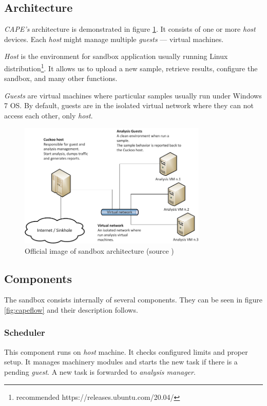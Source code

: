 \subsection{Architecture}
\emph{CAPE's} architecture is demonstrated in figure \ref{fig:capearchitecture}. It consists of one or more \emph{host} devices. Each \emph{host} might manage multiple \emph{guests} --- virtual machines. 

\emph{Host} is the environment for sandbox application usually running Linux distribution\footnote{recommended https://releases.ubuntu.com/20.04/}. It allows us to upload a new sample, retrieve results, configure the sandbox, and many other functions.

\emph{Guests} are virtual machines where particular samples usually run under Windows 7 OS. By default, guests are in the isolated virtual network where they can not access each other, only \emph{host}.

\begin{figure}[h]
  \centering
  \includegraphics[width=0.8\textwidth]{figures/architecture.png}
  \caption{Official image of sandbox architecture (source \cite{CAPESand75:online})}
  \label{fig:capearchitecture}
\end{figure}


\subsection{Components}
The sandbox consists internally of several components. They can be seen in figure \ref{fig:capeflow} and their description follows.

\subsubsection*{Scheduler}
This component runs on \emph{host} machine. It checks configured limits and proper setup. It manages machinery modules and starts the new task if there is a pending \emph{guest}. A new task is forwarded to \emph{analysis manager}.

